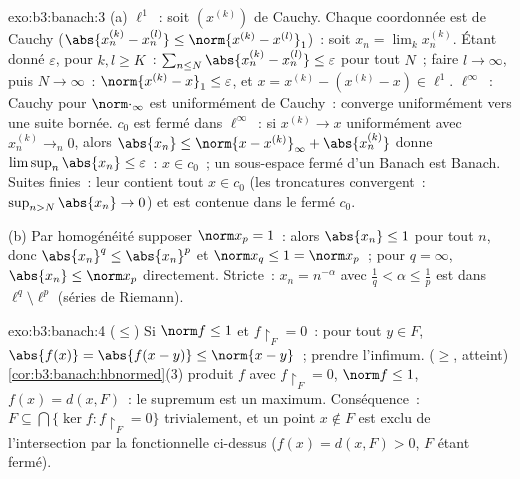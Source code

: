\begin{solution}{exo:b3:banach:3}
(a) $\ell^1$~: soit $(x^{(k)})$ de Cauchy. Chaque coordonnée
est de Cauchy ($\abs{x^{(k)}_n - x^{(l)}_n} \leq
\norm{x^{(k)} - x^{(l)}}_1$)~: soit $x_n =
\lim_kx^{(k)}_n$. Étant donné $\varepsilon$, pour $k, l \geq
K$~: $\sum_{n \leq N}\abs{x^{(k)}_n - x^{(l)}_n} \leq
\varepsilon$ pour tout $N$~; faire $l \to \infty$, puis $N \to
\infty$~: $\norm{x^{(k)} - x}_1 \leq \varepsilon$, et $x =
x^{(k)} - (x^{(k)} - x) \in \ell^1$. $\ell^\infty$~: Cauchy
pour $\norm\cdot_\infty$ est uniformément de Cauchy~: converge
uniformément vers une suite bornée. $c_0$ est fermé dans
$\ell^\infty$~: si $x^{(k)} \to x$ uniformément avec
$x^{(k)}_n \to_n 0$, alors $\abs{x_n} \leq \norm{x -
x^{(k)}}_\infty + \abs{x^{(k)}_n}$ donne
$\limsup_n\abs{x_n} \leq \varepsilon$~: $x \in c_0$~; un
sous-espace fermé d'un Banach est Banach. Suites finies~: leur
 contient tout $x \in c_0$ (les troncatures
convergent~: $\sup_{n>N}\abs{x_n} \to 0$) et est contenue
dans le fermé $c_0$.

(b) Par homogénéité supposer $\norm x_p = 1$~: alors
$\abs{x_n} \leq 1$ pour tout $n$, donc $\abs{x_n}^q \leq
\abs{x_n}^p$ et $\norm x_q \leq 1 = \norm x_p$~; pour $q =
\infty$, $\abs{x_n} \leq \norm x_p$ directement. Stricte~:
$x_n = n^{-\alpha}$ avec $\frac1q < \alpha \leq \frac1p$ est
dans $\ell^q \setminus \ell^p$ (séries de Riemann).
\end{solution}

\begin{solution}{exo:b3:banach:4}
($\leq$) Si $\norm f \leq 1$ et $f\restriction_F = 0$~: pour
tout $y \in F$, $\abs{f(x)} = \abs{f(x - y)} \leq \norm{x -
y}$~; prendre l'infimum. ($\geq$, atteint)
\cref{cor:b3:banach:hbnormed}(3) produit $f$ avec
$f\restriction_F = 0$, $\norm f \leq 1$, $f(x) = d(x, F)$~: le
supremum est un maximum. Conséquence~: $F \subseteq
\bigcap\{\ker f : f\restriction_F = 0\}$ trivialement, et un
point $x \notin F$ est exclu de l'intersection par la
fonctionnelle ci-dessus ($f(x) = d(x,F) > 0$, $F$ étant
fermé).
\end{solution}


